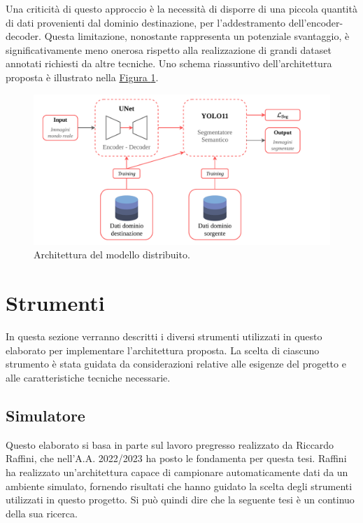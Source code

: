 \documentclass[12pt]{report}
\begin{document}
Una criticità di questo approccio è la necessità di disporre di una piccola quantità di dati provenienti dal dominio destinazione, per l'addestramento dell'encoder-decoder. Questa limitazione, nonostante rappresenta un potenziale svantaggio, è significativamente meno onerosa rispetto alla realizzazione di grandi dataset annotati richiesti da altre tecniche. Uno schema riassuntivo dell'architettura proposta è illustrato nella \hyperref[fig:architettura-unet-yolo]{Figura \ref{fig:architettura-unet-yolo}}.

\begin{figure}[t]
	\centering
	\includegraphics[width=\textwidth, clip]{images/unet-yolo-architecture}
	\caption{Architettura del modello distribuito.}
	\label{fig:architettura-unet-yolo}
\end{figure}

\section{Strumenti}
\label{sec:strumenti}

In questa sezione verranno descritti i diversi strumenti utilizzati in questo elaborato per implementare l'architettura proposta. La scelta di ciascuno strumento è stata guidata da considerazioni relative alle esigenze del progetto e alle caratteristiche tecniche necessarie.

\subsection{Simulatore}
\label{sec:simulatore}

Questo elaborato si basa in parte sul lavoro pregresso realizzato da Riccardo Raffini, che nell'A.A. 2022/2023 ha posto le fondamenta per questa tesi. Raffini ha realizzato un'architettura capace di campionare automaticamente dati da un ambiente simulato, fornendo risultati che hanno guidato la scelta degli strumenti utilizzati in questo progetto. Si può quindi dire che la seguente tesi è un continuo della sua ricerca.
\end{document}

